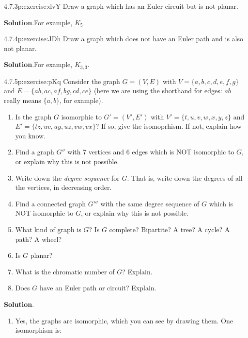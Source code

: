\documentclass[twoside,11pt,]{book}
\newcommand{\blocktitlefont}{\relax}
\numberwithin{equation}{chapter}
\begin{document}
\begin{divisionsolution}{4.7.3}{}{p:exercise:dvY}%
Draw a graph which has an Euler circuit but is not planar.%
\par\smallskip%
\noindent\textbf{\blocktitlefont Solution}.\quad{}For example, \(K_5\).%
\end{divisionsolution}%
\begin{divisionsolution}{4.7.4}{}{p:exercise:JDh}%
Draw a graph which does not have an Euler path and is also not planar.%
\par\smallskip%
\noindent\textbf{\blocktitlefont Solution}.\quad{}For example, \(K_{3,3}\).%
\end{divisionsolution}%
\begin{divisionsolution}{4.7.5}{}{p:exercise:pKq}%
Consider the graph \(G = (V, E)\) with \(V = \{a,b,c,d,e,f,g\}\) and \(E = \{ab, ac, af, bg,
cd, ce\}\) (here we are using the shorthand for edges: \(ab\) really means \(\{a,b\}\), for example).%
\begin{enumerate}[label=(\alph*)]
\item{}Is the graph \(G\) isomorphic to \(G' = (V', E')\) with \(V' = \{t, u, v, w, x, y, z\}\) and \(E' = \{tz, uv,
uy, uz, vw,
vx\}\)? If so, give the isomoprhism. If not, explain how you know.%
\item{}Find a graph \(G''\) with 7 vertices and 6 edges which is NOT isomorphic to \(G\), or explain why this is not possible.%
\item{}Write down the \emph{degree sequence} for \(G\). That is, write down the degrees of all the vertices, in decreasing order.%
\item{}Find a connected graph \(G'''\) with the same degree sequence of \(G\) which is NOT isomorphic to \(G\), or explain why this is not possible.%
\item{}What kind of graph is \(G\)? Is \(G\) complete? Bipartite? A tree? A cycle? A path? A wheel?%
\item{}Is \(G\) planar?%
\item{}What is the chromatic number of \(G\)? Explain.%
\item{}Does \(G\) have an Euler path or circuit? Explain.%
\end{enumerate}
%
\par\smallskip%
\noindent\textbf{\blocktitlefont Solution}.\quad{}%
\begin{enumerate}[label=(\alph*)]
\item{}Yes, the graphs are isomorphic, which you can see by drawing them. One isomorphism is:%

\end{enumerate}
\end{divisionsolution}
\end{document}
